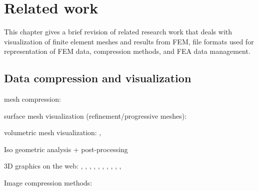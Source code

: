 \chapter{Related work}
\label{chapter:related-work}

This chapter gives a brief revision of related research work that deals with visualization of finite element meshes and results from FEM, file formats used for representation of FEM data, compression methods, and FEA data management.


\section{Data compression and visualization}

mesh compression:

surface mesh visualization (refinement/progressive meshes):
\cite{Gudukbay2002}
\cite{Vasa2011}
\cite{Alliez2001}
\cite{Maglo2012}
\cite{Valette2004}

\cite{Hoppe1996}


volumetric mesh visualization:
\cite{Ueng2004}, \cite{Robaina2010}

Iso geometric analysis + post-processing
\cite{Stahl2017}

3D graphics on the web:
\cite{Evans2014}
\newline
\cite{Hoppe1998}, \cite{Limper2013}, \cite{Maglo2012}, \cite{Lavoue2013}, \cite{Valette2009}, \cite{Charland2011}, \cite{Behr2012}, \cite{OpenCTM2010}, \cite{Mouton2011}, \cite{Marion2012}, \cite{Alliez2005}

Image compression methods:
\cite{Lui2001}
\cite{Watson1994}

